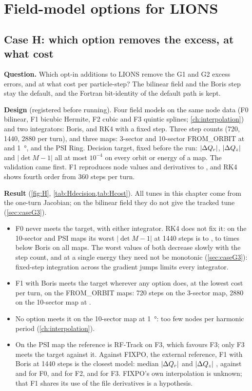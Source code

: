 \chapter{Field-model options for LIONS}\label{ch:options}

\section{Case H: which option removes the excess, at what cost}\label{sec:caseH}
\textbf{Question.}
Which opt-in additions to LIONS remove the G1 and G2 excess errors, and at what cost per particle-step?
The bilinear field and the Boris step stay the default, and the Fortran bit-identity of the default path is kept.

\textbf{Design} (registered before running).
Four field models on the same node data (F0 bilinear, F1 bicubic Hermite, F2 cubic and F3 quintic splines;
\cref{ch:interpolation}) and two integrators: Boris, and RK4 with a fixed step.
Three step counts (720, 1440, 2880 per turn), and three maps: 3-sector and 10-sector FROM\_ORBIT at \thirddeg{} and
\SI{1}{\degree}, and the PSI Ring.
Decision target, fixed before the run: $|\Delta Q_r|$, $|\Delta Q_z|$ and $|\det M - 1|$ all at most $10^{-4}$ on every orbit
or energy of a map.
The validation came first.
F1 reproduces node values and derivatives to \HFOneNodes, and RK4 shows fourth order from 360 steps per turn.

\textbf{Result} (\cref{fig:H}, \cref{tab:Hdecision,tab:Hcost}).
All tunes in this chapter come from the one-turn Jacobian; on the bilinear field they do not give the tracked tune (\cref{sec:caseG3}).
\begin{itemize}
\item F0 never meets the target, with either integrator.
RK4 does not fix it: on the 10-sector and PSI maps its worst $|\det M - 1|$ at 1440 steps is \HFzeroRkDetMin{} to
\HFzeroRkDetMax, \HBorisOverRkMin{} to \HBorisOverRkMax{} times below Boris on all maps.
The worst values of both decrease slowly with the step count, and at a single energy they need not be monotonic (\cref{sec:caseG3}): fixed-step integration across the gradient jumps limits every integrator.
\item F1 with Boris meets the target wherever any option does, at the lowest cost per turn, on the FROM\_ORBIT maps:
720 steps on the 3-sector map, 2880 on the 10-sector map at \thirddeg{}.
\item No option meets it on the 10-sector map at \SI{1}{\degree}: too few nodes per harmonic period
(\cref{ch:interpolation}).
\item On the PSI map the reference is RF-Track on F3, which favours F3; only F3 meets the target against it.
Against FIXPO, the external reference, F1 with Boris at 1440 steps is the closest model: median $|\Delta Q_r|$
\HFixpoHermQrMed{} and $|\Delta Q_z|$ \HFixpoHermQzMed, against \HFixpoBilQrMed{} and \HFixpoBilQzMed{} for F0,
\HFixpoCubQrMed{} and \HFixpoCubQzMed{} for F2, \HFixpoQuinQrMed{} and \HFixpoQuinQzMed{} for F3.
FIXPO's own interpolation is unknown; that F1 shares its use of the file derivatives is a hypothesis.
\end{itemize}

